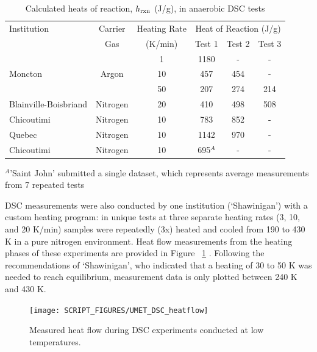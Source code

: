 \documentclass{book}
\begin{document}
\begin{table}[ht]
\caption{Calculated heats of reaction, $h_{\rm rxn}$ (J/g), in anaerobic DSC tests}
\label{Table_11}
\begin{center}
\begin{tabular}{|l|c|c|ccc|}
\hline
Institution           & Carrier     & Heating Rate         & \multicolumn{3}{|c|}{Heat of Reaction (J/g)} \\ \cline{4-6}
                      & Gas         & (K/min)              & Test 1  & Test 2  & Test 3                 \\ \hline
                      &             & 1                    & 1180    & -       & -                      \\
Moncton               & Argon       & 10                   & 457     & 454     & -                      \\
                      &             & 50                   & 207     & 274     & 214                    \\ \hline
Blainville-Boisbriand & Nitrogen    & 20                   & 410     & 498     & 508                    \\ \hline
Chicoutimi            & Nitrogen    & 10                   & 783     & 852     & -                      \\ \hline
Quebec                & Nitrogen    & 10                   & 1142    & 970     & -                      \\ \hline
Chicoutimi            & Nitrogen    & 10                   & 695$^A$ & -       & -                      \\ \hline
\end{tabular}
\end{center}
$^A$'Saint John' submitted a single dataset, which represents average measurements from 7 repeated tests
\end{table}

DSC measurements were also conducted by one institution (‘Shawinigan’) with a custom heating program: in unique tests at three separate heating rates (3, 10, and 20 K/min) samples were repeatedly (3x) heated and cooled from 190 to 430 K in a pure nitrogen environment. Heat flow measurements from the heating phases of these experiments are provided in Figure ~\ref{Fig:UMET_DSC_heatflow} . Following the recommendations of ‘Shawinigan’, who indicated that a heating of 30 to 50 K was needed to reach equilibrium, measurement data is only plotted between 240 K and 430 K.

\begin{figure}
  \centering
  \texttt{[image: SCRIPT\_FIGURES/UMET\_DSC\_heatflow]}
  \caption{Measured heat flow during DSC experiments conducted at low temperatures.}
  \label{Fig:UMET_DSC_heatflow}
\end{figure}
\end{document}
